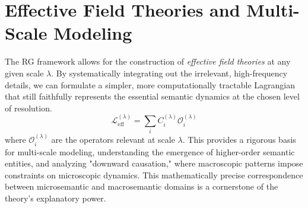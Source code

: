 
\section{Effective Field Theories and Multi-Scale Modeling}
\label{sec:effective_field_theories_and_multi_scale_modeling}

The RG framework allows for the construction of \textit{effective field theories} at any given scale \(\lambda\). By systematically integrating out the irrelevant, high-frequency details, we can formulate a simpler, more computationally tractable Lagrangian that still faithfully represents the essential semantic dynamics at the chosen level of resolution.
\begin{equation}
\mathcal{L}_{\mathrm{eff}}^{(\lambda)} = \sum_{i} C_{i}^{(\lambda)} \mathcal{O}_{i}^{(\lambda)}
\end{equation}
where \(\mathcal{O}_{i}^{(\lambda)}\) are the operators relevant at scale \(\lambda\). This provides a rigorous basis for multi-scale modeling, understanding the emergence of higher-order semantic entities, and analyzing "downward causation," where macroscopic patterns impose constraints on microscopic dynamics. This mathematically precise correspondence between microsemantic and macrosemantic domains is a cornerstone of the theory's explanatory power. 